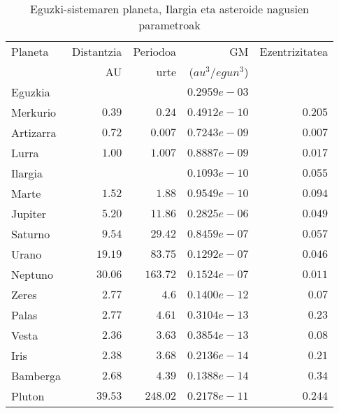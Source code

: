 \begin{table} [h!]
\caption[Eguzki-sistemaren planeta, Ilargia eta asteroide nagusien parametroak]{Eguzki-sistemaren planeta, Ilargia eta asteroide nagusien parametroak}
\label{tab:laskp}       %
\begin{tabular}{l r r r r } 
\hline
 Planeta   &  Distantzia   & Periodoa    & GM             & Ezentrizitatea \\   
           &   AU          &   urte      & ($au^3/egun^3$) & \\ \hline
 Eguzkia    &               &             & $0.2959e-03$   & \\          
 Merkurio   &   $0.39$      &  $0.24$     & $0.4912e-10$   & $0.205$ \\
 Artizarra  &   $0.72$      &  $0.007$    & $0.7243e-09$   & $0.007$\\
 Lurra      &   $1.00$      &  $1.007$    & $0.8887e-09$   & $0.017$\\
 Ilargia    &               &             & $0.1093e-10$   & $0.055$\\ 
 Marte      &   $1.52$      &  $1.88$     & $0.9549e-10$   & $0.094$\\ \hline
 Jupiter    &   $5.20$      &  $11.86$    & $0.2825e-06$   & $0.049$\\
 Saturno    &   $9.54$      &  $29.42$    & $0.8459e-07$   & $0.057$\\ 
 Urano      &   $19.19$     &  $83.75$    & $0.1292e-07$   & $0.046$\\
 Neptuno    &   $30.06$     &  $163.72$   & $0.1524e-07$   & $0.011$ \\ \hline
 Zeres      &   $2.77$      &  $4.6$      & $0.1400e-12$   & $0.07$ \\
 Palas      &   $2.77$      &  $4.61$     & $0.3104e-13$   & $0.23$ \\
 Vesta      &   $2.36$      &  $3.63$     & $0.3854e-13$   & $0.08$\\
 Iris       &   $2.38$      &  $3.68$     & $0.2136e-14$   & $0.21$ \\
 Bamberga   &   $2.68$      &  $4.39$     & $0.1388e-14$   & $0.34$ \\ \hline
 Pluton     &   $39.53$     &  $248.02$   & $0.2178e-11$   & $0.244$ \\
\hline
\end{tabular}
\end{table}

